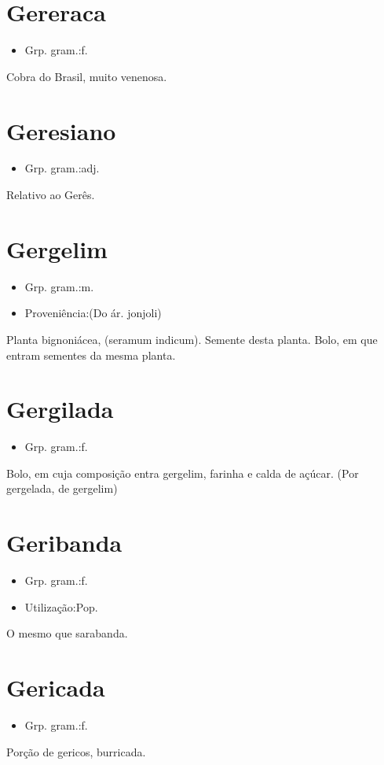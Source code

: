 \section{Gereraca}
\begin{itemize}
\item {Grp. gram.:f.}
\end{itemize}
Cobra do Brasil, muito venenosa.
\section{Geresiano}
\begin{itemize}
\item {Grp. gram.:adj.}
\end{itemize}
Relativo ao Gerês.
\section{Gergelim}
\begin{itemize}
\item {Grp. gram.:m.}
\end{itemize}
\begin{itemize}
\item {Proveniência:(Do ár. \textunderscore jonjoli\textunderscore )}
\end{itemize}
Planta bignoniácea, (\textunderscore seramum indicum\textunderscore ).
Semente desta planta.
Bolo, em que entram sementes da mesma planta.
\section{Gergilada}
\begin{itemize}
\item {Grp. gram.:f.}
\end{itemize}
Bolo, em cuja composição entra gergelim, farinha e calda de açúcar.
(Por \textunderscore gergelada\textunderscore , de \textunderscore gergelim\textunderscore )
\section{Geribanda}
\begin{itemize}
\item {Grp. gram.:f.}
\end{itemize}
\begin{itemize}
\item {Utilização:Pop.}
\end{itemize}
O mesmo que \textunderscore sarabanda\textunderscore .
\section{Gericada}
\begin{itemize}
\item {Grp. gram.:f.}
\end{itemize}
Porção de gericos, burricada.

